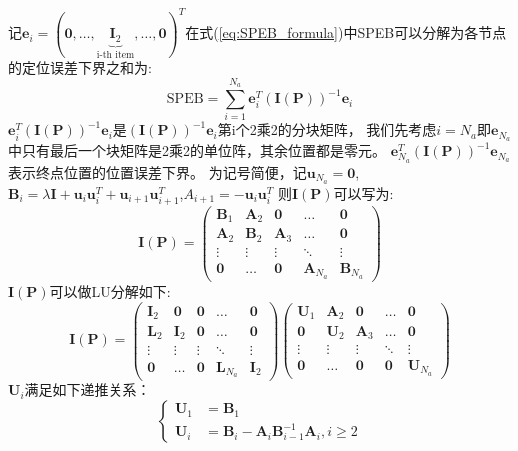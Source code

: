 记$\bm{e}_i=(\bm{0},\dots,\underbrace{\bm{I}_2}_{\text{i-th item}},\dots,\bm{0})^T$在式(\ref{eq:SPEB_formula})中SPEB可以分解为各节点的定位误差下界之和为:
\begin{equation}\label{eq:SPEB_every_node}
  \text{SPEB}=\sum_{i=1}^{N_a} \bm{e}_i^T(\bm{I}(\bm{P}))^{-1}\bm{e}_i
\end{equation}
$\bm{e}_i^T(\bm{I}(\bm{P}))^{-1}\bm{e}_i$是$(\bm{I}(\bm{P}))^{-1}\bm{e}_i$第i个2乘2的分块矩阵，
我们先考虑$i=N_a$即$\bm{e}_{N_a}$中只有最后一个块矩阵是2乘2的单位阵，其余位置都是零元。
$\bm{e}_{N_a}^T(\bm{I}(\bm{P}))^{-1}\bm{e}_{N_a}$表示终点位置的位置误差下界。
为记号简便，记$\bm{u}_{N_a}=\bm{0}$,$\bm{B}_i=\lambda\bm{I}+\bm{u}_i\bm{u}_i^T+\bm{u}_{i+1}\bm{u}_{i+1}^T$,$A_{i+1}=-\bm{u}_i\bm{u}_i^T$
则$\bm{I}(\bm{P})$可以写为:
\[
\bm{I}(\bm{P})=\begin{pmatrix}
                 \bm{B}_1 & \bm{A}_2 & \bm{0} & \dots & \bm{0} \\
                 \bm{A}_2 & \bm{B}_2 & \bm{A}_3 & \dots & \bm{0} \\
                 \vdots & \vdots & \vdots & \ddots & \vdots \\
                 \bm{0} & \dots & \bm{0} & \bm{A}_{N_a} & \bm{B}_{N_a}
               \end{pmatrix}
\]
$\bm{I}(\bm{P})$可以做LU分解如下:
\begin{equation}\label{eq:LU}
  \bm{I}(\bm{P})=\begin{pmatrix}
                 \bm{I}_2 & \bm{0} & \bm{0} & \dots & \bm{0} \\
                 \bm{L}_2 & \bm{I}_2 & \bm{0} & \dots & \bm{0} \\
                 \vdots & \vdots & \vdots & \ddots & \vdots \\
                 \bm{0} & \dots & \bm{0} & \bm{L}_{N_a} & \bm{I}_{2}
               \end{pmatrix}\begin{pmatrix}
                 \bm{U}_1 & \bm{A}_2 & \bm{0} & \dots & \bm{0} \\
                 \bm{0} & \bm{U}_2 & \bm{A}_3 & \dots & \bm{0} \\
                 \vdots & \vdots & \vdots & \ddots & \vdots \\
                 \bm{0} & \dots & \bm{0} & \bm{0} & \bm{U}_{N_a}
               \end{pmatrix}
\end{equation}
$\bm{U}_i$满足如下递推关系：
\begin{equation}\label{eq:U_recursive_formula}
\begin{cases}
  \bm{U}_1 &= \bm{B}_1 \\
  \bm{U}_i &= \bm{B}_i-\bm{A}_i\bm{B}_{i-1}^{-1}\bm{A}_i,i\geq 2
\end{cases}
\end{equation}
